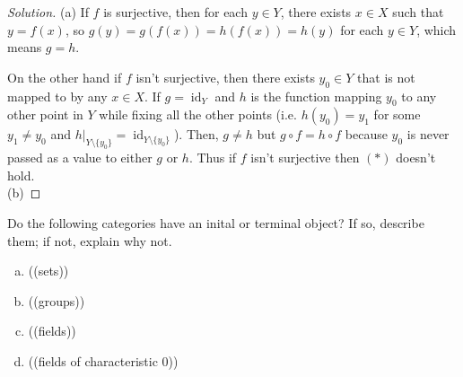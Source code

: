 \documentclass[10pt]{article}
\providecommand{\ii}{\item}
\newenvironment{soln}{\begin{proof}[Solution]}{\end{proof}}
\providecommand{\id}{\operatorname{id}}
\newcommand{\doubleparen}[1]{(\!(#1)\!)}
\begin{document}
\begin{soln}
    (a) If $f$ is surjective, then for each $y\in Y$,
    there exists $x\in X$ such that $y = f(x)$, so
    $g(y) = g(f(x)) = h(f(x)) = h(y)$ for each $y\in Y$,
    which means $g = h$.

    On the other hand if $f$ isn't surjective, then
    there exists $y_0\in Y$ that is not mapped to by any $x\in X$.
    If $g = \id_Y$ and $h$ is the function mapping $y_0$
    to any other point in $Y$ while fixing all the other points
    (i.e. $h(y_0) = y_1$ for some $y_1\ne y_0$ and
    $h|_{Y\setminus\{y_0\}} = \id_{Y\setminus\{y_0\}}$).
    Then, $g\ne h$ but $g\circ f = h\circ f$
    because $y_0$ is never passed as a value to either $g$ or $h$.
    Thus if $f$ isn't surjective then $(*)$ doesn't hold.
    \\

    (b) 
\end{soln}

\begin{problem}
    Do the following categories have an inital or terminal object?
    If so, describe them; if not, explain why not.
    \begin{enumerate}[(a)]
	\ii \doubleparen{sets}
	\ii \doubleparen{groups}
	\ii \doubleparen{fields}
	\ii \doubleparen{fields of characteristic $0$}
    \end{enumerate}
\end{problem}
\end{document}
